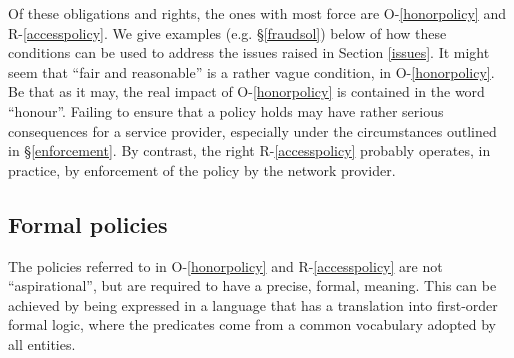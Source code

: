 Of these obligations and rights, the ones with most force are
O-\ref{honorpolicy} and R-\ref{accesspolicy}.  We give examples
(e.g. \S\ref{fraudsol}) below of how these conditions can be used
to address the issues raised in Section \ref{issues}. It might
seem that ``fair and reasonable'' is a rather vague condition,
in O-\ref{honorpolicy}. Be that as it may, the real impact of
O-\ref{honorpolicy} is contained in the word ``honour''. Failing
to ensure that a policy holds may have rather serious consequences
for a service provider, especially under the circumstances outlined
in \S\ref{enforcement}. By contrast, the right R-\ref{accesspolicy}
probably operates, in practice, by enforcement of the policy by the
network provider.

\subsection{Formal policies}\label{formalpolicies}

The policies referred to in O-\ref{honorpolicy} and R-\ref{accesspolicy}
are not ``aspirational'', but are required to have a precise, formal,
meaning. This can be achieved by being expressed in a language that has
a translation into first-order formal logic, where the predicates come
from a common vocabulary adopted by all entities.

